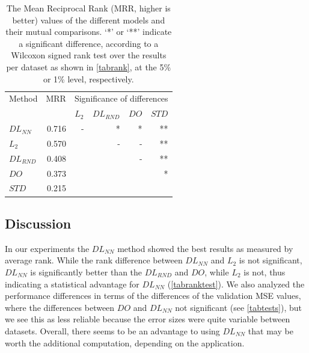 \documentclass[conference]{IEEEtran}
\begin{document}
\begin{table}[h]
    \begin{center}
    \begin{small}
    \begin{sc}
    
    \begin{tabular}{lr|rrrr}
    \toprule
    Method & MRR & \multicolumn{4}{c}{Significance of differences} \\ 
     &  & \multicolumn{1}{c}{$L_2$} & \multicolumn{1}{c}{$DL_{RND}$} & \multicolumn{1}{c}{$DO$} & \multicolumn{1}{c}{$STD$} \\ \midrule
    $DL_{NN}$ & 0.716 & -  & *  & *  & **  \\
    $L_2$ & 0.570 & & - & - & **  \\
    $DL_{RND}$ & 0.408 & & & - & ** \\
    $DO$ & 0.373 & & & & *  \\
    $STD$ & 0.215 & & & & \\ \bottomrule 
    
    \end{tabular}
    \end{sc}
    \end{small}
    \end{center} 
    \caption{The Mean Reciprocal Rank (MRR, higher is better) values of the different models and their mutual comparisons. `*' or `**' indicate a significant difference, according to a Wilcoxon signed rank test over the results per dataset as shown in \autoref{tabrank}, at the 5\% or 1\% level, respectively.}
    \label{tabranktest}
    
\end{table}



\subsection{Discussion}\label{sec:discussion}

In our experiments the $DL_{NN}$ method showed the best results as measured by average rank. 
While the rank difference between $DL_{NN}$ and $L_2$ is not significant, $DL_{NN}$ is significantly better than the $DL_{RND}$ and $DO$, while $L_2$ is not, thus indicating a statistical advantage for $DL_{NN}$ (\autoref{tabranktest}).  
We also analyzed the performance differences in terms of the differences of the validation MSE values, where the differences between $DO$ and $DL_{NN}$ not significant (see \autoref{tabtests}), but we see this as less reliable because the error sizes were quite variable between datasets. 
Overall, there seems to be an advantage to using $DL_{NN}$ that may be worth the additional computation, depending on the application.
\end{document}
